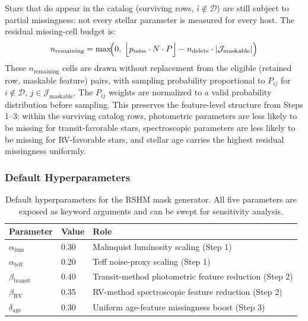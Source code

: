 \documentclass[preprint]{aastex631}
\begin{document}
Stars that do appear in the catalog (surviving rows, $i \notin \mathcal{D}$) are still subject to partial missingness: not every stellar parameter is measured for every host. The residual missing-cell budget is:
\begin{equation}
  n_{\mathrm{remaining}} = \max\!\Bigl(0,\;\Bigl\lfloor p_{\mathrm{miss}} \cdot N \cdot P\Bigr\rfloor - n_{\mathrm{delete}} \cdot |\mathcal{J}_{\mathrm{maskable}}|\Bigr)
  \label{eq:residual-budget}
\end{equation}
These $n_{\mathrm{remaining}}$ cells are drawn without replacement from the eligible (retained row, maskable feature) pairs, with sampling probability proportional to $P_{ij}$ for $i \notin \mathcal{D}$, $j \in \mathcal{J}_{\mathrm{maskable}}$. The $P_{ij}$ weights are normalized to a valid probability distribution before sampling. This preserves the feature-level structure from Steps 1--3: within the surviving catalog rows, photometric parameters are less likely to be missing for transit-favorable stars, spectroscopic parameters are less likely to be missing for RV-favorable stars, and stellar age carries the highest residual missingness uniformly.

\subsubsection*{Default Hyperparameters}

\begin{table}[h]
  \centering
  \begin{tabular}{lll}
    \hline
    \textbf{Parameter} & \textbf{Value} & \textbf{Role} \\
    \hline
    $\alpha_{\mathrm{lum}}$    & 0.30 & Malmquist luminosity scaling (Step 1) \\
    $\alpha_{\mathrm{teff}}$   & 0.20 & Teff noise-proxy scaling (Step 1) \\
    $\beta_{\mathrm{transit}}$ & 0.40 & Transit-method photometric feature reduction (Step 2) \\
    $\beta_{\mathrm{RV}}$      & 0.35 & RV-method spectroscopic feature reduction (Step 2) \\
    $\delta_{\mathrm{age}}$    & 0.30 & Uniform age-feature missingness boost (Step 3) \\
    \hline
  \end{tabular}
  \caption{Default hyperparameters for the RSHM mask generator. All five parameters are exposed as keyword arguments and can be swept for sensitivity analysis.}
  \label{tab:rshm-params}
\end{table}


\end{document}
